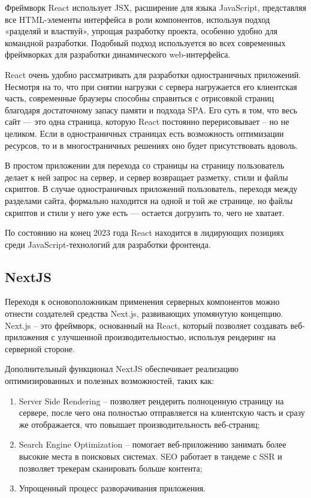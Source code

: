 \documentclass[master, och, pract]{SCWorks}
\begin{document}
Фреймворк React использует JSX, расширение для языка JavaScript, представляя все HTML-элементы интерфейса в роли компонентов, используя подход «разделяй и властвуй», упрощая разработку проекта, особенно удобно для командной разработки. Подобный подход используется во всех современных фреймворках для разработки динамического web-интерфейса\cite{Ershov_web}.

React очень удобно рассматривать для разработки одностраничных приложений. Несмотря на то, что при снятии нагрузки с сервера нагружается его клиентская часть, современные браузеры способны справиться с отрисовкой страниц благодаря достаточному запасу памяти и подхода SPA. Его суть в том, что весь сайт — это одна страница, которую React постоянно перерисовывает – но не целиком. Если в одностраничных страницах есть возможность оптимизации ресурсов, то и в многостраничных решениях оно будет присутствовать вдоволь.

В простом приложении для перехода со страницы на страницу пользователь делает к ней запрос на сервер, и сервер возвращает разметку, стили и файлы скриптов. В случае одностраничных приложений пользователь, переходя между разделами сайта, формально находится на одной и той же странице, но файлы скриптов и стили у него уже есть — остается догрузить то, чего не хватает. 

По состоянию на конец 2023 года React находится в лидирующих позициях среди JavaScript-технологий для разработки фронтенда\cite{rjs}.




\subsection{NextJS}
Переходя к основоположникам применения серверных компонентов можно отнести создателей средства Next.js, развивающих упомянутую концепцию. Next.js – это фреймворк, основанный на React, который позволяет создавать веб-приложения с улучшенной производительностью, используя рендеринг на серверной стороне\cite{Cheprasov}.

Дополнительный функционал NextJS обеспечивает реализацию оптимизированных и полезных возможностей, таких как:
\begin{enumerate}
    \item Server Side Rendering – позволяет рендерить полноценную страницу на сервере, после чего она полностью отправляется на клиентскую часть и сразу же отображается, что повышает производительность веб-страниц;
    \item Search Engine Optimization – помогает веб-приложению занимать более высокие места в поисковых системах. SEO работает в тандеме с SSR и позволяет трекерам сканировать больше контента;
    \item Упрощенный процесс разворачивания приложения\cite{Nikitin_nextjs}.
\end{enumerate}
\end{document}
